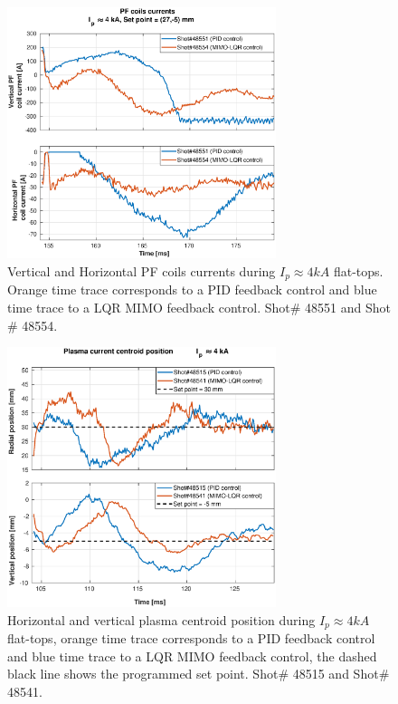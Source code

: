 \begin{figure}
	\centering
	\includegraphics[width=0.7\textwidth]{Chp5/PIDvsMIMO_551_554_curr_2.eps}
	\caption{   Vertical and Horizontal PF coils currents during  $I_p\approx 4kA$  flat-tops. Orange time trace corresponds to a PID feedback control and blue time trace to a LQR MIMO feedback control.  Shot$\#$ 48551 and Shot$\#$ 48554.}
\end{figure}
\begin{figure}
	\centering
	\includegraphics[width=0.7\textwidth]{Chp5/PIDvsMIMO_515_541_2.eps}
	\caption{Horizontal and vertical plasma centroid position during  $I_p\approx 4kA$  flat-tops, orange time trace corresponds to a PID feedback control and blue time trace to a LQR MIMO feedback control, the dashed black line shows the programmed set point.  Shot$\#$ 48515 and Shot$\#$ 48541.}
\end{figure}

